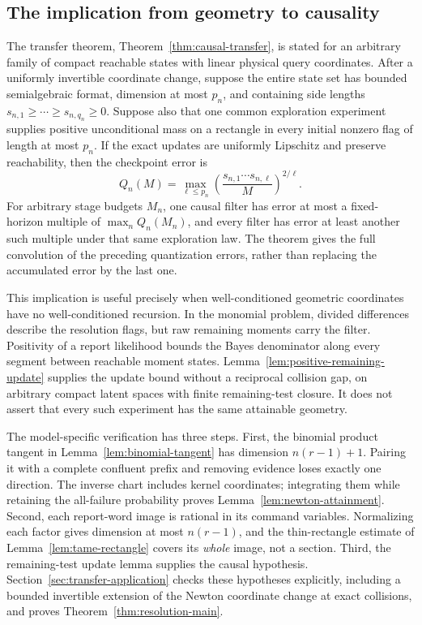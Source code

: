 \subsection{The implication from geometry to causality}
The transfer theorem, Theorem~\ref{thm:causal-transfer}, is stated for
an arbitrary family of compact reachable states with linear physical
query coordinates. After a uniformly invertible coordinate change,
suppose the entire state set has bounded semialgebraic format,
dimension at most $p_n$, and containing side lengths
$s_{n,1}\ge\cdots\ge s_{n,q_n}\ge0$. Suppose also that one common
exploration experiment supplies positive unconditional mass on a
rectangle in every initial nonzero flag of length at most $p_n$.
If the exact updates are uniformly Lipschitz and preserve reachability,
then the checkpoint error is
\[
 Q_n(M)=\max_{\ell\le p_n}
       \left(\frac{s_{n,1}\cdots s_{n,\ell}}{M}\right)^{2/\ell}.
\]
For arbitrary stage budgets $M_n$, one causal filter has error at most
a fixed-horizon multiple of $\max_n Q_n(M_n)$, and every filter has
error at least another such multiple under that same exploration law.
The theorem gives the full convolution of the preceding quantization
errors, rather than replacing the accumulated error by the last one.

This implication is useful precisely when well-conditioned geometric
coordinates have no well-conditioned recursion. In the monomial
problem, divided differences describe the resolution flags, but raw
remaining moments carry the filter. Positivity of a report likelihood
bounds the Bayes denominator along every segment between reachable
moment states. Lemma~\ref{lem:positive-remaining-update} supplies the
update bound without a reciprocal collision gap, on arbitrary compact
latent spaces with finite remaining-test closure. It does not assert
that every such experiment has the same attainable geometry.

The model-specific verification has three steps. First, the binomial
product tangent in Lemma~\ref{lem:binomial-tangent} has dimension
$n(r-1)+1$. Pairing it with a complete confluent prefix and removing
evidence loses exactly one direction. The inverse chart includes
kernel coordinates; integrating them while retaining the all-failure
probability proves Lemma~\ref{lem:newton-attainment}. Second, each
report-word image is rational in its command variables. Normalizing
each factor gives dimension at most $n(r-1)$, and the
thin-rectangle estimate of Lemma~\ref{lem:tame-rectangle} covers its
\emph{whole} image, not a section. Third, the remaining-test update
lemma supplies the causal hypothesis. Section~\ref{sec:transfer-application}
checks these hypotheses explicitly, including a bounded invertible
extension of the Newton coordinate change at exact collisions, and
proves Theorem~\ref{thm:resolution-main}.


